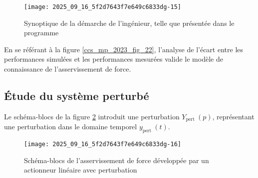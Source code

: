 

\begin{figure}[!h]
\centering
\texttt{[image: 2025\_09\_16\_5f2d7643f7e649c6833dg-15]}
\caption{\label{ccs_mp_2023_fig_23}Synoptique de la démarche de l'ingénieur, telle que présentée dans le programme}
\end{figure}


En se référant à la figure \ref{ccs_mp_2023_fig_22}, l'analyse de l'écart entre les performances simulées et les performances mesurées valide le modèle de connaissance de l'asservissement de force.\\

\ifprof
\begin{corrige}
\end{corrige}
\else
\fi


\subsection{Étude du système perturbé}%
Le schéma-blocs de la figure \ref{ccs_mp_2023_fig_24} introduit une perturbation $Y_{\text {pert }}(p)$, représentant une perturbation dans le domaine temporel $y_{\text {pert }}(t)$.



\begin{figure}[!h]
\centering
\texttt{[image: 2025\_09\_16\_5f2d7643f7e649c6833dg-16]}
\caption{\label{ccs_mp_2023_fig_24}  Schéma-blocs de l'asservissement de force développée par un actionneur linéaire avec perturbation}
\end{figure}

